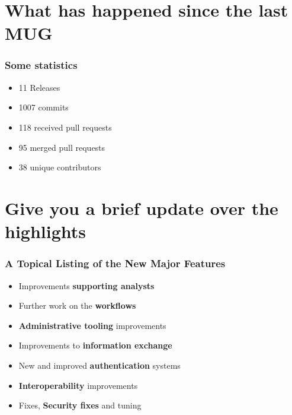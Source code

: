 
\begin{frame}
\titlepage
\end{frame}


\section{What has happened since the last MUG}

\begin{frame}
  \frametitle{Some statistics}
  \begin{itemize}
      \item 11 Releases
      \item 1007 commits
      \item 118 received pull requests
      \item 95 merged pull requests
      \item 38 unique contributors
  \end{itemize}
\end{frame}


\section{Give you a brief update over the highlights}

\begin{frame}
  \frametitle{A Topical Listing of the New Major Features}
  \begin{itemize}
      \item Improvements {\bf supporting analysts}
      \item Further work on the {\bf workflows}
      \item {\bf Administrative tooling} improvements
      \item Improvements to {\bf information exchange}
      \item New and improved {\bf authentication} systems
      \item {\bf Interoperability} improvements
      \item Fixes, {\bf Security fixes} and tuning
  \end{itemize}
\end{frame}

